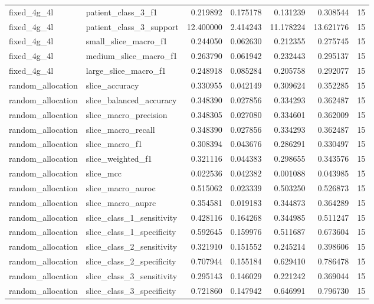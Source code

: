 \begin{tabular}{llrrrrr}
fixed_4g_4l & patient_class_3_f1 & 0.219892 & 0.175178 & 0.131239 & 0.308544 & 15 \\
fixed_4g_4l & patient_class_3_support & 12.400000 & 2.414243 & 11.178224 & 13.621776 & 15 \\
fixed_4g_4l & small_slice_macro_f1 & 0.244050 & 0.062630 & 0.212355 & 0.275745 & 15 \\
fixed_4g_4l & medium_slice_macro_f1 & 0.263790 & 0.061942 & 0.232443 & 0.295137 & 15 \\
fixed_4g_4l & large_slice_macro_f1 & 0.248918 & 0.085284 & 0.205758 & 0.292077 & 15 \\
random_allocation & slice_accuracy & 0.330955 & 0.042149 & 0.309624 & 0.352285 & 15 \\
random_allocation & slice_balanced_accuracy & 0.348390 & 0.027856 & 0.334293 & 0.362487 & 15 \\
random_allocation & slice_macro_precision & 0.348305 & 0.027080 & 0.334601 & 0.362009 & 15 \\
random_allocation & slice_macro_recall & 0.348390 & 0.027856 & 0.334293 & 0.362487 & 15 \\
random_allocation & slice_macro_f1 & 0.308394 & 0.043676 & 0.286291 & 0.330497 & 15 \\
random_allocation & slice_weighted_f1 & 0.321116 & 0.044383 & 0.298655 & 0.343576 & 15 \\
random_allocation & slice_mcc & 0.022536 & 0.042382 & 0.001088 & 0.043985 & 15 \\
random_allocation & slice_macro_auroc & 0.515062 & 0.023339 & 0.503250 & 0.526873 & 15 \\
random_allocation & slice_macro_auprc & 0.354581 & 0.019183 & 0.344873 & 0.364289 & 15 \\
random_allocation & slice_class_1_sensitivity & 0.428116 & 0.164268 & 0.344985 & 0.511247 & 15 \\
random_allocation & slice_class_1_specificity & 0.592645 & 0.159976 & 0.511687 & 0.673604 & 15 \\
random_allocation & slice_class_2_sensitivity & 0.321910 & 0.151552 & 0.245214 & 0.398606 & 15 \\
random_allocation & slice_class_2_specificity & 0.707944 & 0.155184 & 0.629410 & 0.786478 & 15 \\
random_allocation & slice_class_3_sensitivity & 0.295143 & 0.146029 & 0.221242 & 0.369044 & 15 \\
random_allocation & slice_class_3_specificity & 0.721860 & 0.147942 & 0.646991 & 0.796730 & 15 \\

\end{tabular}
